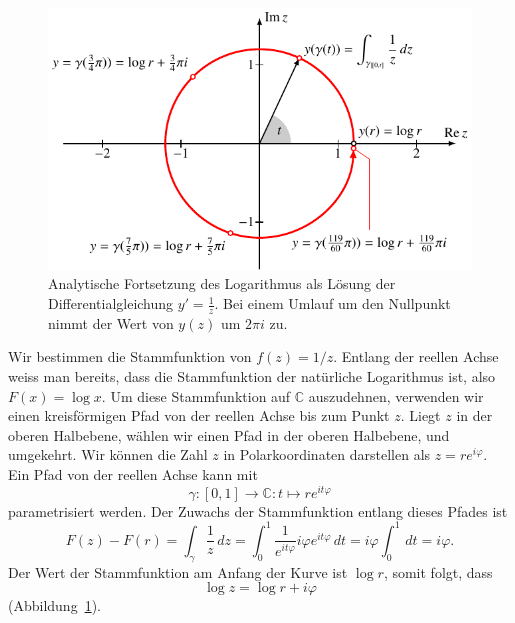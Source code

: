 \begin{beispiel}
\begin{figure}
\centering
\includegraphics{chapters/080-funktionentheorie/images/logforts.pdf}
\caption{Analytische Fortsetzung des Logarithmus als Lösung der
Differentialgleichung $y'=\frac1z$.
Bei einem Umlauf um den Nullpunkt nimmt der Wert von $y(z)$ um
$2\pi i$ zu.
\label{komplex:analytische-fortsetzung-log}
}
\end{figure}
Wir bestimmen die Stammfunktion von $f(z)=1/z$.
Entlang der reellen Achse weiss man bereits, dass die Stammfunktion
der natürliche Logarithmus ist, also $F(x)=\log x$.
Um diese Stammfunktion auf $\mathbb C$ auszudehnen, verwenden wir einen
kreisförmigen Pfad von der reellen Achse bis zum Punkt $z$.
Liegt $z$ in der oberen Halbebene, wählen wir einen Pfad in der
oberen Halbebene, und umgekehrt.
Wir können die Zahl $z$ in Polarkoordinaten darstellen als $z=re^{i\varphi}$.
Ein Pfad von der reellen Achse kann mit
\[
\gamma\colon [0,1]\to\mathbb C: t\mapsto re^{it\varphi}
\]
parametrisiert werden.
Der Zuwachs der Stammfunktion entlang dieses Pfades ist
\[
F(z)-F(r)
=
\int_\gamma\frac1z\,dz
=
\int_0^1 \frac1{e^{it\varphi}}i\varphi e^{it\varphi}\,dt
=
i\varphi \int_0^1\,dt
=
i\varphi.
\]
Der Wert der Stammfunktion am Anfang der Kurve ist $\log r$, somit
folgt, dass
\[
\log z = \log r + i\varphi
\]
(Abbildung~\ref{komplex:analytische-fortsetzung-log}).
\end{beispiel}


